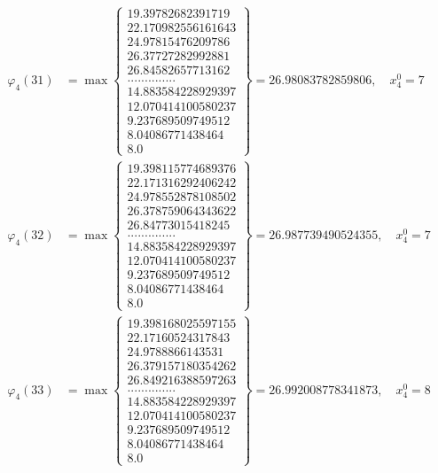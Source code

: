 \documentclass{article}
\begin{document}
\begin{align*}
  
  
  
\varphi_{4}(31) &= \max \left\{ \begin{array}{c}
19.39782682391719 \\
 22.170982556161643 \\
 24.97815476209786 \\
 26.37727282992881 \\
 26.84582657713162 \\
 .............. \\
 14.883584228929397 \\
 12.070414100580237 \\
 9.237689509749512 \\
 8.04086771438464 \\
 8.0
\end{array} \right\} = 26.98083782859806, \quad x_{4}^0 = 7\\
  
  
  
  
\varphi_{4}(32) &= \max \left\{ \begin{array}{c}
19.398115774689376 \\
 22.171316292406242 \\
 24.978552878108502 \\
 26.378759064343622 \\
 26.84773015418245 \\
 .............. \\
 14.883584228929397 \\
 12.070414100580237 \\
 9.237689509749512 \\
 8.04086771438464 \\
 8.0
\end{array} \right\} = 26.987739490524355, \quad x_{4}^0 = 7\\
  
  
  
  
\varphi_{4}(33) &= \max \left\{ \begin{array}{c}
19.398168025597155 \\
 22.17160524317843 \\
 24.9788866143531 \\
 26.379157180354262 \\
 26.849216388597263 \\
 .............. \\
 14.883584228929397 \\
 12.070414100580237 \\
 9.237689509749512 \\
 8.04086771438464 \\
 8.0
\end{array} \right\} = 26.992008778341873, \quad x_{4}^0 = 8\\
  

\end{align*}
\end{document}
